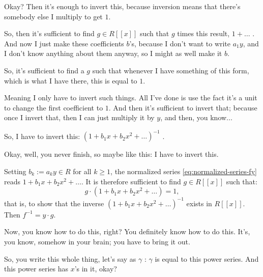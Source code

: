 \begin{proofWrapper}
\begin{speech}[00:39:07 - 00:40:25]
Okay? Then it's enough to invert this, because inversion means that there's somebody else I multiply to get $1$.

So, then it's sufficient to find $g \in R[[x]]$  such that $g$ times this result, $1 + \dots$ . And now I just make these coefficients $b$'s, because I don't want to write $a_1 y$, and I don't know anything about them anyway, so I might as well make it $b$.

So, it's sufficient to find a $g$ such that whenever I have something of this form, which is what I have there, this is equal to $1$.

Meaning I only have to invert such things. All I've done is use the fact it's a unit to change the first coefficient to $1$. And then it's sufficient to invert that; because once I invert that, then I can just multiply it by $y$, and then, you know...

So, I have to invert this: $(1 + b_1 x + b_2 x^2 + \dots)^{-1}$ .

Okay, well, you never finish, so maybe like this: I have to invert this.
\end{speech}

\begin{content}
Setting $b_k := a_k y \in R$ for all $k \ge 1$, the normalized series \eqref{eq:normalized-series-fy} reads $1 + b_1 x + b_2 x^2 + \dots$. It is therefore sufficient to find $g \in R[[x]]$ such that:
\begin{equation}\label{eq:one-plus-b-series}
g \cdot (1 + b_1 x + b_2 x^2 + \dots) = 1,
\end{equation}
that is, to show that the inverse $(1 + b_1 x + b_2 x^2 + \dots)^{-1}$ exists in $R[[x]]$. Then $f^{-1} = y \cdot g$.
\end{content}

\begin{speech}[00:40:25 - 00:41:31]
Now, you know how to do this, right? You definitely know how to do this. It's, you know, somehow in your brain; you have to bring it out.

So, you write this whole thing, let's say as $\gamma$ : $\gamma$ is equal to this power series. And this power series has $x$'s in it, okay?


\end{speech}
\end{proofWrapper}
